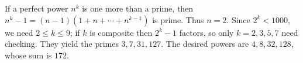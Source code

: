 If a perfect power $n^k$ is one more than a prime, then $n^k-1=(n-1)(1+n+\cdots+n^{k-1})$ is prime. Thus $n=2$. Since $2^k<1000$, we need $2\le k\le9$; if $k$ is composite then $2^k-1$ factors, so only $k=2,3,5,7$ need checking. They yield the primes $3,7,31,127$. The desired powers are $4,8,32,128$, whose sum is $\boxed{172}$.
